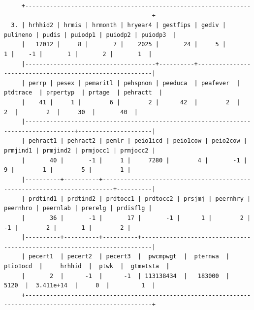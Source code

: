 \documentclass[
]{book}
\begin{document}
\begin{verbatim}
     +----------------------------------------------------------------------------------------------------------+
  3. | hrhhid2 | hrmis | hrmonth | hryear4 | gestfips | gediv | pulineno | pudis | puiodp1 | puiodp2 | puiodp3  |
     |   17012 |     8 |       7 |    2025 |       24 |     5 |        1 |    -1 |       1 |       2 |       1  |
     |-------------------------------------+----------+---------------------------------------------------------|
     | perrp | pesex | pemaritl | pehspnon | peeduca  | peafever  | ptdtrace  | prpertyp  | prtage  | pehractt  |
     |    41 |     1 |        6 |        2 |      42  |        2  |        2  |        2  |     30  |       40  |
     |------------------------------------------------------------------------------------+---------------------|
     | pehract1 | pehract2 | pemlr | peio1icd | peio1cow | peio2cow | prmjind1 | prmjind2 | prmjocc1 | prmjocc2 |
     |       40 |       -1 |     1 |     7280 |        4 |       -1 |        9 |       -1 |        5 |       -1 |
     |----------+----------+-------------------------------------------------------------------------+----------|
     | prdtind1 | prdtind2 | prdtocc1 | prdtocc2 | prsjmj | peernhry | peernhro | peernlab | prerelg | prdisflg |
     |       36 |       -1 |       17 |       -1 |      1 |        2 |       -1 |        2 |       1 |        2 |
     |----------+----------+----------+-------------------------------------------------------------------------|
     | pecert1  | pecert2  | pecert3  |  pwcmpwgt  |  pternwa  |  ptio1ocd  |     hrhhid  |  ptwk  |  gtmetsta  |
     |       2  |      -1  |      -1  | 113138434  |   183000  |      5120  |  3.411e+14  |     0  |         1  |
     +----------------------------------------------------------------------------------------------------------+


\end{verbatim}
\end{document}

